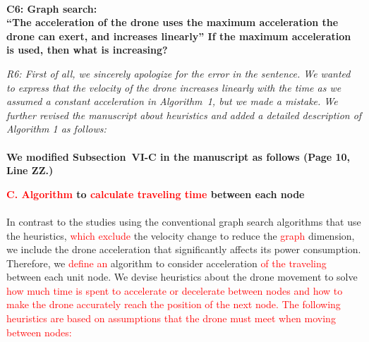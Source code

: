 \documentclass[onecolumn]{IEEEconf}
\begin{document}
\begin{description}
\begin{mdframed}[ linewidth=.75pt, userdefinedwidth=0.9\textwidth]
    \end{mdframed} 
    ~\\
    \item \textbf
    {
	C6: Graph search: \\
	``The acceleration of the drone uses the maximum acceleration the drone can exert, and increases linearly'' If the maximum acceleration is used, then what is increasing?	
	}
	\item \textit
	{
	R6: First of all, we sincerely apologize for the error in the sentence. We wanted to express that the velocity of the drone increases linearly with the time as we assumed a constant acceleration in Algorithm~1, but we made a mistake. We further revised the manuscript about heuristics and added a detailed description of Algorithm 1 as follows:
	}
    ~\\
    ~\\
	\textbf{We modified Subsection~VI-C in the manuscript as follows (Page 10, Line ZZ.)}
    \begin{mdframed} [ linewidth=.75pt, userdefinedwidth=0.9\textwidth]
    \textbf{\textcolor{red}{C. Algorithm} to \textcolor{red}{calculate traveling time} between each node}~\\
    ~\\
    In contrast to the studies using the conventional graph search algorithms that use the heuristics, \textcolor{red}{which exclude} the velocity change to reduce the \textcolor{red}{graph} dimension, we include the drone acceleration that significantly affects its power consumption.
    Therefore, we \textcolor{red}{define an} algorithm to consider acceleration \textcolor{red}{of the traveling} between each unit node. 
    We devise heuristics about the drone movement to solve \textcolor{red}{how much time is spent to accelerate or decelerate between nodes and how to make the drone accurately reach the position of the next node.
    The following heuristics are based on assumptions that the drone must meet when moving between nodes:}
    \begin{itemize}

\end{itemize}
\end{mdframed}
\end{description}
\end{document}
